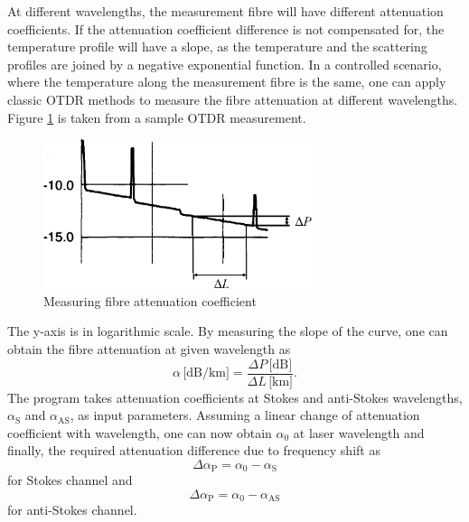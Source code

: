 \documentclass{standalone}
\begin{document}
At different wavelengths, the measurement fibre will have different attenuation coefficients. If the attenuation coefficient difference is not compensated for, the temperature profile will have a slope, as the temperature and the scattering profiles are joined by a negative exponential function. In a controlled scenario, where the temperature along the measurement fibre is the same, one can apply classic OTDR methods to measure the fibre attenuation at different wavelengths. Figure \ref{fig:otdr_attenuation} is taken from a sample OTDR measurement. 
\begin{figure}[b]
	\centering
	\includegraphics[width=0.7\textwidth]{otdr_attenuation.png}
	\caption{Measuring fibre attenuation coefficient \cite{fer:oks}}
	\label{fig:otdr_attenuation}
\end{figure}
The y-axis is in logarithmic scale. By measuring the slope of the curve, one can obtain the fibre attenuation at given wavelength as \cite{fer:oks}\cite{UnderstandingOTDRs2000}
\begin{equation}
\alpha \, \textrm{[dB/km]} = \dfrac{\varDelta P \, \textrm{[dB]}}{\varDelta L \, \textrm{[km]}} \textrm{.}
\end{equation}
The program takes attenuation coefficients at Stokes and anti-Stokes wavelengths, $\alpha_\textrm{S}$ and $\alpha_\textrm{AS}$, as input parameters. Assuming a linear change of attenuation coefficient with wavelength, one can now obtain $\alpha_0$ at laser wavelength and finally, the required attenuation difference due to frequency shift as
\begin{equation}
\varDelta \alpha_\textrm{P} = \alpha_0 - \alpha_\textrm{S}
\end{equation}
for Stokes channel and
\begin{equation}
\varDelta \alpha_\textrm{P} = \alpha_0 - \alpha_\textrm{AS}
\end{equation}
for anti-Stokes channel. \\
\end{document}
